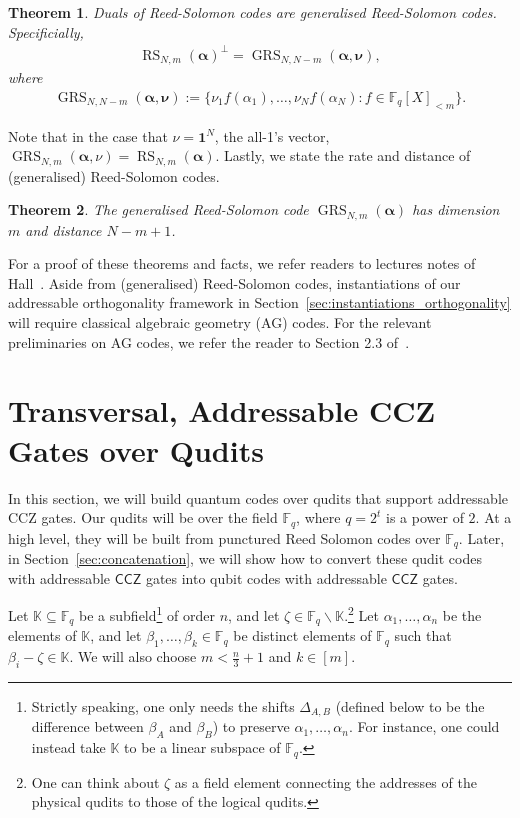 \documentclass[11pt]{article}
\newtheorem{theorem}{Theorem}[section]
\theoremstyle{definition}
\newcommand{\CCZ}{\mathsf{CCZ}}
\newcommand{\bigN}{N}
\newcommand{\bbF}{\mathbb{F}}
\newcommand{\al}{\alpha}
\newcommand{\bal}{\boldsymbol{\alpha}}
\newcommand{\FF}{\mathbb{F}}
\newcommand{\KK}{\mathbb{K}}
\DeclareMathOperator{\RS}{RS}
\DeclareMathOperator{\GRS}{GRS}
\begin{document}
\begin{theorem}\label{thm:GRS_dual}
    Duals of Reed-Solomon codes are generalised Reed-Solomon codes. Specificially,
    \begin{align}
        \RS_{\bigN,m}(\bal)^\perp = \GRS_{\bigN,\bigN-m}(\bal, \mathbf{\nu}),
    \end{align}
    where 
    \begin{align}
        \GRS_{\bigN, \bigN-m}(\bal, \mathbf{\nu}) := \{ \nu_1 f(\al_1), \dots, \nu_{\bigN} f(\al_{\bigN}) : f \in \FF_q[X]_{<m} \}. 
    \end{align}
\end{theorem}
Note that in the case that $\nu = \mathbf{1}^{\bigN}$, the all-1's vector, $\GRS_{\bigN, m}(\bal, \nu) = \RS_{\bigN, m}(\bal)$. 
Lastly, we state the rate and distance of (generalised) Reed-Solomon codes.
\begin{theorem} \label{thm:GRS-rate-distance}
    The generalised Reed-Solomon code $\GRS_{\bigN, m}(\mathbf{\alpha})$ has dimension $m$ and distance $\bigN-m+1$. 
\end{theorem}
For a proof of these theorems and facts, we refer readers to lectures notes of Hall~\cite{hall2003notes}. Aside from (generalised) Reed-Solomon codes, instantiations of our addressable orthogonality framework in Section~\ref{sec:instantiations_orthogonality} will require classical algebraic geometry (AG) codes. For the relevant preliminaries on AG codes, we refer the reader to Section 2.3 of~\cite{wills2024constant}.






\section{Transversal, Addressable CCZ Gates over Qudits}\label{sec:intrablock_GRS}

In this section, we will build quantum codes over qudits that support addressable CCZ gates. Our qudits will be over the field $\bbF_q$, where $q = 2^t$ is a power of $2$. At a high level, they will be built from punctured Reed Solomon codes over $\bbF_q$. Later, in Section~\ref{sec:concatenation}, we will show how to convert these qudit codes with addressable $\CCZ$ gates into qubit codes with addressable $\CCZ$ gates.

Let $\KK \subseteq \FF_q$ be a subfield\footnote{Strictly speaking, one only needs the shifts $\Delta_{A,B}$ (defined below to be the difference between $\beta_A$ and $\beta_B$) to preserve $\alpha_1, \dots, \alpha_n$. For instance, one could instead take $\KK$ to be a linear subspace of $\mathbb{F}_q$.} of order $n$, and let $\zeta \in \FF_q \backslash \KK$.\footnote{One can think about $\zeta$ as a field element connecting the addresses of the physical qudits to those of the logical qudits.} Let $\alpha_1, \dots, \alpha_n$ be the elements of $\KK$, and let $\beta_1, \dots, \beta_k \in \FF_q$ be distinct elements of $\bbF_q$ such that $\beta_i - \zeta \in \KK$. We will also choose $m < \frac{n}{3} + 1$ and $k \in [m]$. 
\end{document}
